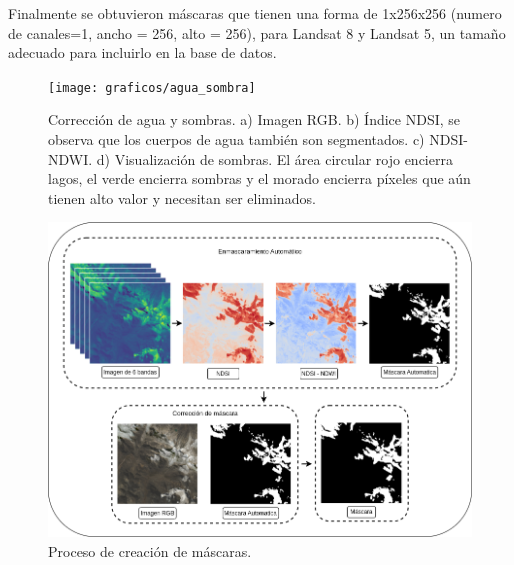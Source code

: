 Finalmente se obtuvieron máscaras que tienen una forma de 1x256x256 (numero de canales=1, ancho = 256, alto = 256), para Landsat 8 y Landsat 5, un tamaño adecuado para incluirlo en la base de datos.

\begin{figure}[h!]
	\centering
	\texttt{[image: graficos/agua\_sombra]}
	\caption[Corrección de agua y sombras.]{Corrección de agua y sombras. a) Imagen RGB. b) Índice NDSI, se observa que los cuerpos de agua también son segmentados. c) NDSI-NDWI. d) Visualización de sombras. El área circular rojo encierra lagos, el verde encierra sombras y el morado encierra píxeles que aún tienen alto valor y necesitan ser eliminados.}
	\label{fig:agua_sombra}
\end{figure}
\begin{figure}[h!]
	\centering
	\includegraphics[width=\linewidth]{graficos/Mask_Creating}
	\caption[Proceso de creación de máscaras]{Proceso de creación de máscaras.}
	\label{fig:Mask_Creating}
\end{figure}
